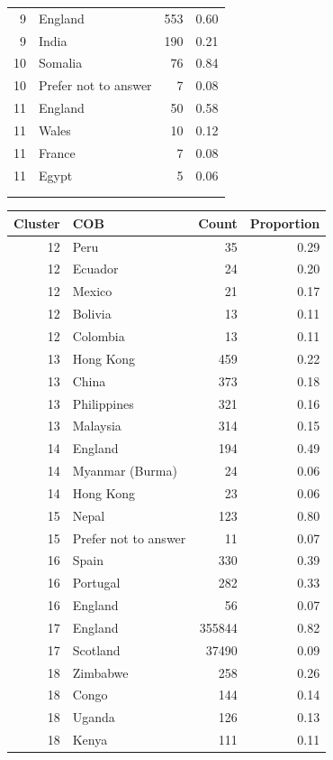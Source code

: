 \begin{table}[ht]
{\begin{tabular}[t]{rlrr}
    9 & England & 553 & 0.60 \\ 
    9 & India & 190 & 0.21 \\ 
   10 & Somalia &  76 & 0.84 \\ 
   10 & Prefer not to answer &   7 & 0.08 \\ 
   11 & England &  50 & 0.58 \\ 
   11 & Wales &  10 & 0.12 \\ 
   11 & France &   7 & 0.08 \\ 
   11 & Egypt &   5 & 0.06 \\ 
    & & & \\
    & & & \\
      \hline
     \end{tabular}
   \begin{tabular}[t]{rlrr}
  \hline
Cluster & COB & Count & Proportion \\ 
  \hline
   12 & Peru &  35 & 0.29 \\ 
   12 & Ecuador &  24 & 0.20 \\ 
   12 & Mexico &  21 & 0.17 \\ 
   12 & Bolivia &  13 & 0.11 \\ 
   12 & Colombia &  13 & 0.11 \\ 
   13 & Hong Kong & 459 & 0.22 \\ 
   13 & China & 373 & 0.18 \\ 
   13 & Philippines & 321 & 0.16 \\ 
   13 & Malaysia & 314 & 0.15 \\ 
   14 & England & 194 & 0.49 \\ 
   14 & Myanmar (Burma) &  24 & 0.06 \\ 
   14 & Hong Kong &  23 & 0.06 \\ 
   15 & Nepal & 123 & 0.80 \\ 
   15 & Prefer not to answer &  11 & 0.07 \\ 
   16 & Spain & 330 & 0.39 \\ 
   16 & Portugal & 282 & 0.33 \\ 
   16 & England &  56 & 0.07 \\ 
   17 & England & 355844 & 0.82 \\ 
   17 & Scotland & 37490 & 0.09 \\ 
   18 & Zimbabwe & 258 & 0.26 \\ 
   18 & Congo & 144 & 0.14 \\ 
   18 & Uganda & 126 & 0.13 \\ 
   18 & Kenya & 111 & 0.11 \\ 

\end{tabular}}
\end{table}
